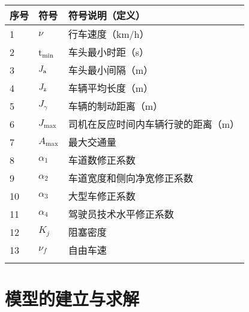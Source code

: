 \documentclass[12pt,a4paper]{nmmcm}
\newcommand{\headcol}{\rowcolor{tableheadcolor}}
\begin{document}
\begin{table}[h!]
  \centering
  \small
  \begin{tabular}{p{60pt}<{\centering}|p{60pt}<{\centering}p{180pt}<{\raggedright}}
    \hline
    \headcol 序号 & 符号           & 符号说明（定义）           \\
    \hline
    1           & $\nu$        & 行车速度（km/h）         \\
    2           & t$_{\min}$   & 车头最小时距（s）          \\
    3           & $J_{\rm a}$  & 车头最小间隔（m）          \\
    4           & $J_{\rm z}$  & 车辆平均长度（m）          \\
    5           & $J_{\gamma}$ & 车辆的制动距离（m）         \\
    6           & $J_{\max}$   & 司机在反应时间内车辆行驶的距离（m） \\
    7           & $A_{\max}$   & 最大交通量              \\
    8           & $\alpha_{1}$ & 车道数修正系数            \\
    9           & $\alpha_{2}$ & 车道宽度和侧向净宽修正系数      \\
    10          & $\alpha_{3}$ & 大型车修正系数            \\
    11          & $\alpha_{4}$ & 驾驶员技术水平修正系数        \\
    12          & $K_{j}$      & 阻塞密度               \\
    13          & $\nu_{f}$    & 自由车速               \\                                         \\
    \hline
  \end{tabular}
  \label{symbol}
\end{table}

\section{模型的建立与求解}
\end{document}
